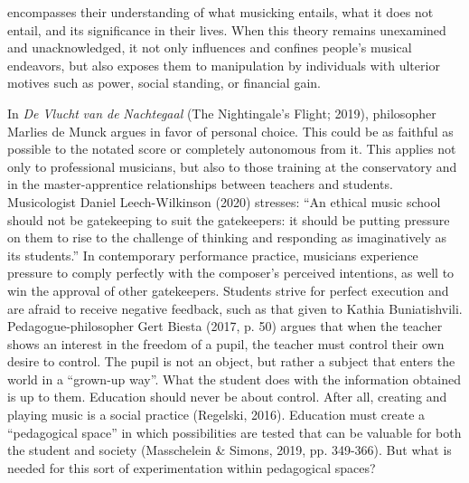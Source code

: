 \documentclass[authordate, empirical, issue]{jote-new-article}
\begin{document}
encompasses their understanding of what musicking entails, what it does not entail, and its significance in their lives. When this theory remains unexamined and unacknowledged, it not only influences and confines people's musical endeavors, but also exposes them to manipulation by individuals with ulterior motives such as power, social standing, or financial gain.



In \emph{De }\emph{Vlucht}\emph{ van de }\emph{Nachtegaal}\emph{ }(The Nightingale's Flight; 2019), philosopher Marlies de Munck argues in favor of personal choice. This could be as faithful as possible to the notated score or completely autonomous from it. This applies not only to professional musicians, but also to those training at the conservatory and in the master-apprentice relationships between teachers and students. Musicologist Daniel Leech-Wilkinson (2020) stresses: “An ethical music school should not be gatekeeping to suit the gatekeepers: it should be putting pressure on them to rise to the challenge of thinking and responding as imaginatively as its students.” In contemporary performance practice, musicians experience pressure to comply perfectly with the composer's perceived intentions, as well to win the approval of other gatekeepers. Students strive for perfect execution and are afraid to receive negative feedback, such as that given to Kathia Buniatishvili. Pedagogue-philosopher Gert Biesta (2017, p. 50) argues that when the teacher shows an interest in the freedom of a pupil, the teacher must control their own desire to control. The pupil is not an object, but rather a subject that enters the world in a “grown-up way”. What the student does with the information obtained is up to them. Education should never be about control. After all, creating and playing music is a social practice (Regelski, 2016). Education must create a “pedagogical space” in which possibilities are tested that can be valuable for both the student and society (Masschelein \& Simons, 2019, pp. 349-366). But what is needed for this sort of experimentation within pedagogical spaces?
\end{document}
